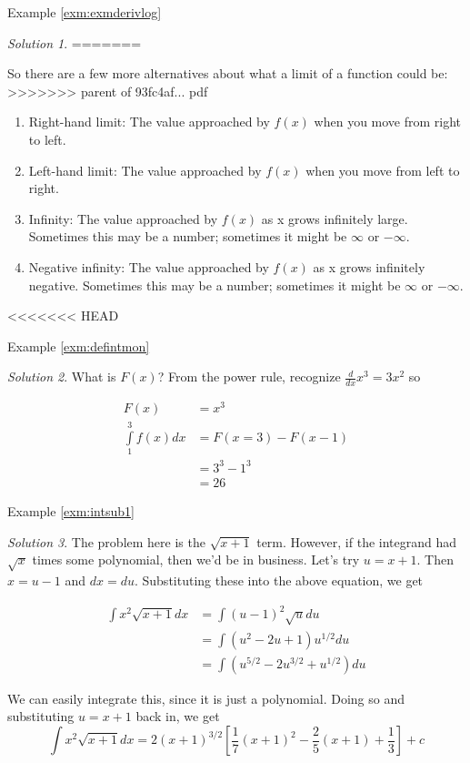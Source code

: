 \documentclass[]{book}
\providecommand{\tightlist}{%
  \setlength{\itemsep}{0pt}\setlength{\parskip}{0pt}}
\theoremstyle{definition}
\theoremstyle{definition}
\theoremstyle{definition}
\theoremstyle{remark}
\newtheorem*{solution}{Solution}
\begin{document}
Example \ref{exm:exmderivlog}

\begin{solution}
{}
=======

So there are a few more alternatives about what a limit of a function could be:
>>>>>>> parent of 93fc4af... pdf

\begin{enumerate}
\def\labelenumi{\arabic{enumi}.}
\tightlist
\item
  Right-hand limit: The value approached by \(f(x)\) when you move from right to left.
\item
  Left-hand limit: The value approached by \(f(x)\) when you move from left to right.
\item
  Infinity: The value approached by \(f(x)\) as x grows infinitely large. Sometimes this may be a number; sometimes it might be \(\infty\) or \(-\infty\).
\item
  Negative infinity: The value approached by \(f(x)\) as x grows infinitely negative. Sometimes this may be a number; sometimes it might be \(\infty\) or \(-\infty\).
\end{enumerate}
<<<<<<< HEAD
\end{solution}

Example \ref{exm:defintmon}

\begin{solution}
{}What is \(F(x)\)? From the power rule, recognize \(\frac{d}{dx}x^3 = 3x^2\) so

\begin{align*}
F(x) &= x^3\\
\int\limits_1^3 f(x) dx &= F(x = 3) - F(x  - 1)\\
&= 3^3 - 1^3\\
&=26
\end{align*}
\end{solution}

Example \ref{exm:intsub1}
\begin{solution}
{}The problem here is the \(\sqrt{x+1}\) term. However, if the integrand had \(\sqrt{x}\) times some polynomial, then we'd be in business. Let's try \(u=x+1\). Then \(x=u-1\) and \(dx=du\). Substituting these into the above equation, we get

\begin{align*}
            \int x^2\sqrt{x+1}dx&= \int (u-1)^2\sqrt{u}du\\
            &= \int (u^2-2u+1)u^{1/2}du\\
            &= \int (u^{5/2}-2u^{3/2}+u^{1/2})du
\end{align*}

We can easily integrate this, since it is just a polynomial. Doing so and substituting \(u=x+1\) back in, we get \[\int x^2\sqrt{x+1}dx=2(x+1)^{3/2}\left[\frac{1}{7}(x+1)^2 -
\frac{2}{5}(x+1)+\frac{1}{3}\right]+c\]
\end{solution}
\end{document}
